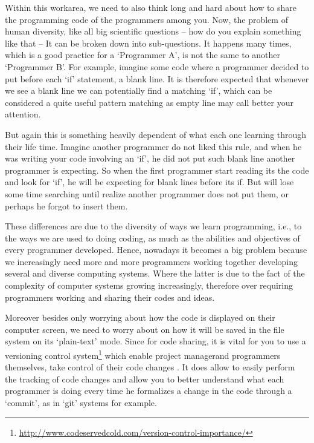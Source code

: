    Within this work\s area, we need to also think long and hard about how to
    share the programming code of the programmers among you. Now, the problem of
    human diversity, like all big scientific questions -- how do you explain
    something like that -- It can be broken down into sub-questions. It happens
    many times, which is a good practice for a `Programmer A', is not the same
    to another `Programmer B'. For example, imagine some code where a programmer
    decided to put before each `if' statement, a blank line. It is therefore
    expected that whenever we see a blank line we can potentially find a
    matching `if', which can be considered a quite useful pattern matching as
    empty line may call better your attention. \cite{aPrettyGoodFormatting}

    But again this is something heavily dependent of what each one learning
    through their life time. Imagine another programmer do not liked this rule,
    and when he was writing your code involving an `if', he did not put such
    blank line another programmer is expecting. So when the first programmer
    start reading its the code and look for `if', he will be expecting for blank
    lines before its if\s. But will lose some time searching until realize
    another programmer does not put them, or perhaps he forgot to insert them.
    \cite{quantifyingProgramComprehension}

    These differences are due to the diversity of ways we learn programming,
    i.e., to the ways we are used to doing coding, as much as the abilities and
    objectives of every programmer developed. Hence, nowadays it becomes a big
    problem because we increasingly need more and more programmers working
    together developing several and diverse computing systems. Where the latter
    is due to the fact of the complexity of computer systems growing
    increasingly, therefore over requiring programmers working and sharing their
    codes and ideas. \cite{howProgrammersRead}

    Moreover besides only worrying about how the code is displayed on their
    computer screen, we need to worry about on how it will be saved in the file
    system on its `plain-text' mode. Since for code sharing, it is vital for you
    to use a versioning control system\footnote{\url{http://www.codeservedcold.com/version-control-importance/}}
    which enable project manager\s and
    programmers themselves, take control of their code changes
    \cite{redesignOfGit}. It does allow to easily perform the tracking of code
    changes \cite{gettingProductive} and
    allow you to better understand what each programmer is doing
    every time he formalizes a change in the code through a `commit', as in
    `git' systems for example. \cite{usingSourceControl}

